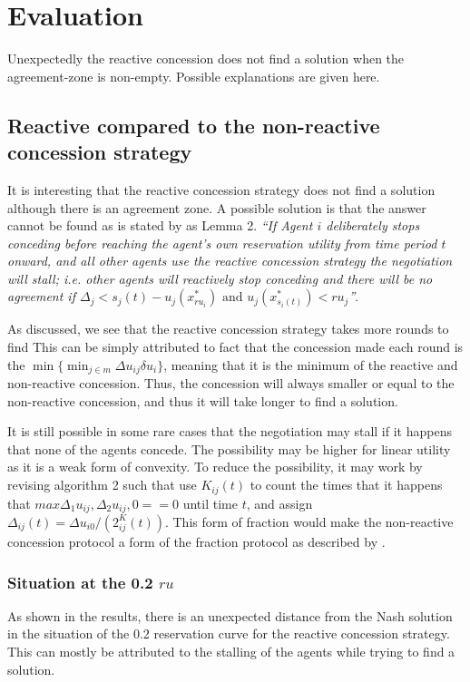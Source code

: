 \clearpage
\section{Evaluation}
Unexpectedly the reactive concession does not find a solution when the agreement-zone is non-empty. Possible explanations are given here.
\subsection{Reactive compared to the non-reactive concession strategy}
It is interesting that the reactive concession strategy does not find a solution although there is an agreement zone. 
A possible solution is that the answer cannot be found as is stated by \citet{zheng2015automated} as Lemma 2. \textit{``If Agent $i$ deliberately stops conceding before reaching the agent's own reservation utility from time period $t$ onward, and all other agents use the reactive concession strategy the negotiation will stall; i.e. other agents will reactively stop conceding and there will be no agreement if $\Delta_j < s_j(t)-u_j(x^*_{ru_i}) \text{ and } u_j(x^*_{s_i(t)})<ru_j$''}.

As discussed, we see that the reactive concession strategy takes more rounds to find  This can be simply attributed to fact that the concession made each round is the $\displaystyle \min\{ \min_{j \in m}\Delta u_{ij} \delta u_i\}$, meaning that it is the minimum of the reactive and non-reactive concession. Thus, the concession will always smaller or equal to the non-reactive concession, and thus it will take longer to find a solution.

It is still possible in some rare cases that the negotiation may stall if it happens that none of the agents concede. The possibility may be higher for linear utility as it is a weak form of convexity. To reduce the possibility, it may work by revising algorithm 2 such that use $K_{ij}(t)$ to count the times that it happens that $max{ \Delta_1 u_{ij},\Delta_2 u_{ij}, 0 } == 0$ until time $t$, and assign $\Delta_{ij}(t) =  \Delta u_{i0}/(2^K_{ij}(t))$. This form of fraction would make the non-reactive concession protocol a form of the fraction protocol as described by \citet{wu2009efficient}.


\subsubsection{Situation at the 0.2 $ru$}
As shown in the results, there is an unexpected distance from the Nash solution in the situation of the 0.2 reservation curve for the reactive concession strategy. This can mostly be attributed to the stalling of the agents while trying to find a solution.

